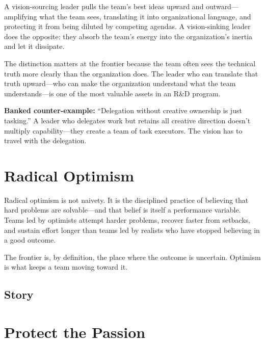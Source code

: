 
A vision-sourcing leader pulls the team's best ideas upward and outward---amplifying
what the team sees, translating it into organizational language, and protecting it
from being diluted by competing agendas. A vision-sinking leader does the opposite:
they absorb the team's energy into the organization's inertia and let it dissipate.

The distinction matters at the frontier because the team often sees the
technical truth more clearly than the organization does. The leader who can
translate that truth upward---who can make the organization understand what
the team understands---is one of the most valuable assets in an R\&D program.

\begin{storybox}
\textbf{Banked counter-example:} ``Delegation without creative ownership is just
tasking.'' A leader who delegates work but retains all creative direction
doesn't multiply capability---they create a team of task executors.
The vision has to travel with the delegation. 
\end{storybox}

\section{Radical Optimism}


Radical optimism is not naivety. It is the disciplined practice of believing that
hard problems are solvable---and that belief is itself a performance variable.
Teams led by optimists attempt harder problems, recover faster from setbacks,
and sustain effort longer than teams led by realists who have stopped believing
in a good outcome.

The frontier is, by definition, the place where the outcome is uncertain.
Optimism is what keeps a team moving toward it.

\subsection{Story}

\section{Protect the Passion}

